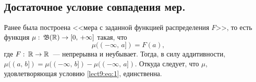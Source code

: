 \newpage


\subsection{Достаточное условие совпадения мер.}

\begin{remark}
    Ранее была построена <<мера с заданной функцией распределения $F$>>, то есть функция
    $\mu:\:\mathfrak{B}(\mathbb{R})\to[0,\,+\infty]$
    такая, что
    \begin{equation}
        \label{lect9:eq:1}
        \mu((-\infty,\, a])=F(a),
    \end{equation}
    где $F:\: \mathbb{R}\to\mathbb{R}$~--- непрерывна и неубывает.
    Тогда, в силу аддитивности, $\mu((a,\,b])=\mu((-\infty,\, b])-\mu((-\infty,\, a])$.
    Откуда следует, что $\mu$, удовлетворяющая условию \eqref{lect9:eq:1}, единственна.
\end{remark}

